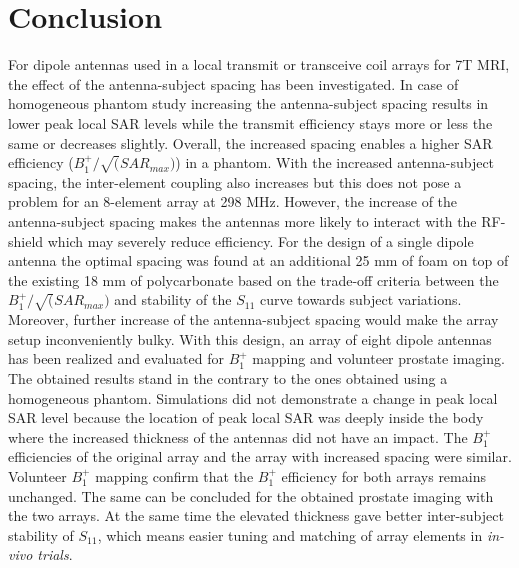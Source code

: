 \documentclass[fleqn,10pt]{wlscirep}
\begin{document}
\section*{Conclusion}

For dipole antennas used in a local transmit or transceive coil arrays for 7T MRI, the effect of the antenna-subject spacing has been investigated. In case of homogeneous phantom study increasing the antenna-subject spacing results in lower peak local SAR levels while the transmit efficiency stays more or less the same or decreases slightly. Overall, the increased spacing enables a higher SAR efficiency ($B_1^{+}/\sqrt(SAR_{max})$) in a phantom. With the increased antenna-subject spacing, the inter-element coupling also increases but this does not pose a problem for an 8-element array at 298 MHz. However, the increase of the antenna-subject spacing makes the antennas more likely to interact with the RF-shield which may severely reduce efficiency. For the design of a single dipole antenna the optimal spacing was found at an additional 25 mm of foam on top of the existing 18 mm of polycarbonate based on the trade-off criteria between the $B_1^{+}/\sqrt(SAR_{max})$ and stability of the $S_{11}$ curve towards subject variations. Moreover, further increase of the antenna-subject spacing would make the array setup inconveniently bulky. With this design, an array of eight dipole antennas has been realized and evaluated for $B_1^{+}$ mapping and volunteer prostate imaging. The obtained results stand in the contrary to the ones obtained using a homogeneous phantom. Simulations did not demonstrate a change in peak local SAR level because the location of peak local SAR was deeply inside the body where the increased thickness of the antennas did not have an impact. The $B_1^{+}$ efficiencies of the original array and the array with increased spacing were similar. Volunteer $B_1^{+}$ mapping confirm that the $B_1^{+}$ efficiency for both arrays remains unchanged. The same can be concluded for the obtained prostate imaging with the two arrays. At the same time the elevated thickness gave better inter-subject stability of $S_{11}$, which means easier tuning and matching of array elements in \textit{in-vivo trials}.
\end{document}
